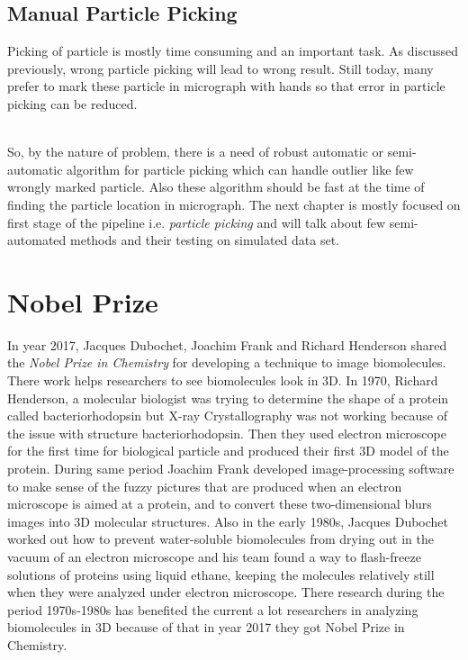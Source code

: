 \documentclass{report}
\begin{document}
\subsection{Manual Particle Picking}
Picking of particle is mostly time consuming and an important task. As discussed previously, wrong particle picking will lead to wrong result. Still today, many prefer to mark these particle in micrograph with hands so that error in particle picking can be reduced.   

\noindent\\
So, by the nature of problem, there is a need of robust automatic or semi-automatic algorithm for particle picking which can handle outlier like few wrongly marked particle. Also these algorithm should be fast at the time of finding the particle location in micrograph. The next chapter is mostly focused on first stage of the pipeline i.e. \textit{particle picking} and will talk about few semi-automated methods and their testing on simulated data set.  

\section{Nobel Prize}
In year 2017, Jacques Dubochet, Joachim Frank and Richard Henderson shared the \textit{Nobel Prize in Chemistry} for developing a technique to image biomolecules. There work helps researchers to see biomolecules look in 3D. In 1970, Richard Henderson, a molecular biologist was trying to determine the shape of a protein called bacteriorhodopsin but X-ray Crystallography was not working because of the issue with structure bacteriorhodopsin. Then they used electron microscope for the first time for biological particle and produced their first 3D model of the protein. During same period Joachim Frank developed image-processing software to make sense of the fuzzy pictures that are produced when an electron microscope is aimed at a protein, and to convert these two-dimensional blurs images into 3D molecular structures. Also in the early 1980s, Jacques Dubochet worked out how to prevent water-soluble biomolecules from drying out in the vacuum of an electron microscope and  his team found a way to flash-freeze solutions of proteins using liquid ethane, keeping the molecules relatively still when they were analyzed under electron microscope. There research during the period 1970s-1980s has benefited the current a lot researchers in analyzing biomolecules in 3D because of that in year 2017 they got Nobel Prize in Chemistry.
\end{document}
